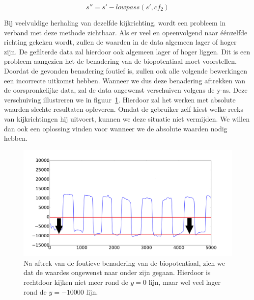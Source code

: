 \documentclass{article}
\begin{document}
\begin{equation}
\label{eq:aftrekkingbiopotentiaal}
s'' = s' - lowpass(s', cf_2)
\end{equation}

Bij veelvuldige herhaling van dezelfde kijkrichting, wordt een probleem in verband met deze methode zichtbaar. Als er veel en opeenvolgend naar éénzelfde richting gekeken wordt, zullen de waarden in de data algemeen lager of hoger zijn. De gefilterde data zal hierdoor ook algemeen lager of hoger liggen. Dit is een probleem aangezien het de benadering van de biopotentiaal moet voorstellen. Doordat de gevonden benadering foutief is, zullen ook alle volgende bewerkingen een incorrecte uitkomst hebben. Wanneer we dus deze benadering aftrekken van de oorspronkelijke data, zal de data ongewenst verschuiven volgens de y-as. Deze verschuiving illustreren we in figuur~\ref{fig:bio_fout}.   Hierdoor zal het werken met absolute waarden slechte resultaten opleveren. Omdat de gebruiker zelf kiest welke reeks van kijkrichtingen hij uitvoert, kunnen we deze situatie niet vermijden. We willen dan ook een oplossing vinden voor wanneer we de absolute waarden nodig hebben.

\begin{figure}[h]
\centering
\includegraphics[width=\linewidth]{images/biofout}
\caption{Na aftrek van de foutieve benadering van de biopotentiaal, zien we dat de waardes ongewenst naar onder zijn gegaan. Hierdoor is rechtdoor kijken niet meer rond de $y = 0$ lijn, maar wel veel lager rond de $y = -10000$ lijn.}
\label{fig:bio_fout}
\end{figure}
\end{document}
